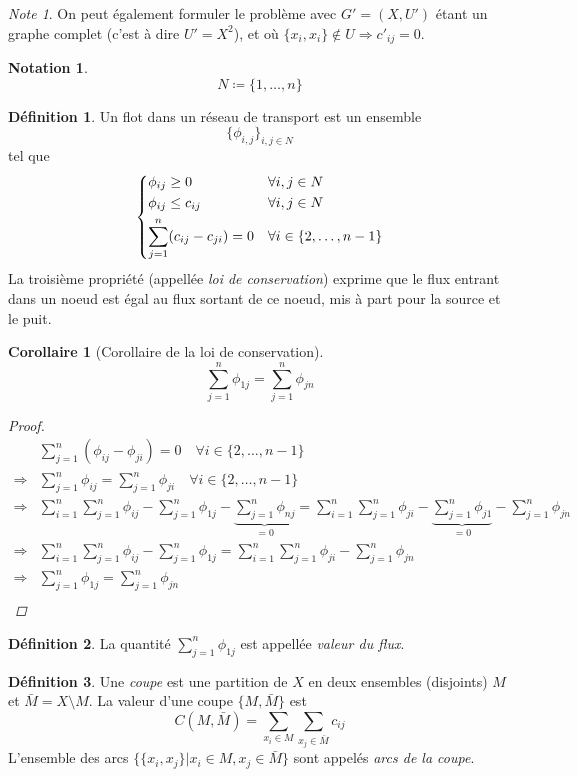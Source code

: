 \documentclass[a4paper]{report}
\theoremstyle{definition}
\newtheorem*{definition}{Définition}
\newtheorem*{notation}{Notation}
\theoremstyle{remark}
\newtheorem*{note}{Note}
\theoremstyle{plain}
\newtheorem{corollary}{Corollaire}
\begin{document}
\begin{note}
On peut également formuler le problème avec \(G'=(X,U')\) étant un graphe
complet (c'est à dire \(U'=X^2\)), et où \(\{x_i,x_i\}\notin U\Rightarrow
c'_{ij}=0\).
\end{note}

\begin{notation}
\[N\coloneqq\{1,\dots,n\}\]
\end{notation}

\begin{definition}
Un flot dans un réseau de transport est un ensemble
\[\{\phi_{i,j}\}_{i,j\in N}\]
tel que
\[\begin{dcases}
	\phi_{ij}\ge 0                 &\forall i,j\in N\\
	\phi_{ij}\le c_{ij}            &\forall i,j\in N\\
	\sum_{j=1}^n(c_{ij}-c_{ji})=0 &\forall i\in \{2,\dots,n-1\}
\end{dcases}\]
La troisième propriété (appellée \emph{loi de conservation}) exprime que le flux
entrant dans un noeud est égal au flux sortant de ce noeud, mis à part pour la
source et le puit.
\end{definition}

\begin{corollary}[Corollaire de la loi de conservation]
\[\sum_{j=1}^n\phi_{1j}=\sum_{j=1}^n\phi_{jn}\]
\begin{proof}
\begin{align}
	&\sum_{j=1}^n(\phi_{ij}-\phi_{ji})=0\quad\forall i\in\{2,\dots,n-1\}\\
	\Rightarrow&\sum_{j=1}^n\phi_{ij}=\sum_{j=1}^n\phi_{ji}\quad\forall i\in\{2,\dots,n-1\}\\
	\Rightarrow&\sum_{i=1}^n\sum_{j=1}^n\phi_{ij}-\sum_{j=1}^n\phi_{1j}-\underbrace{\sum_{j=1}^n\phi_{nj}}_{=0}
		=\sum_{i=1}^n\sum_{j=1}^n\phi_{ji}-\underbrace{\sum_{j=1}^n\phi_{j1}}_{=0}-\sum_{j=1}^n\phi_{jn}\\
	\Rightarrow&\sum_{i=1}^n\sum_{j=1}^n\phi_{ij}-\sum_{j=1}^n\phi_{1j}=
		\sum_{i=1}^n\sum_{j=1}^n\phi_{ji}-\sum_{j=1}^n\phi_{jn}\\
	\Rightarrow&\sum_{j=1}^n\phi_{1j}=\sum_{j=1}^n\phi_{jn}\\
\end{align}
\end{proof}
\end{corollary}

\begin{definition}
	La quantité \(\sum_{j=1}^n\phi_{1j}\) est appellée \emph{valeur du flux}.
\end{definition}

\begin{definition}
Une \emph{coupe} est une partition de \(X\) en deux ensembles (disjoints) \(M\)
et \(\bar M=X\setminus M\). La valeur d'une coupe \(\{M,\bar M\}\) est
\[C(M,\bar M)=\sum_{x_i\in M}\sum_{x_j\in\bar M}c_{ij}\] L'ensemble des arcs
\(\{\{x_i,x_j\}|x_i\in M,x_j\in\bar M\}\) sont appelés \emph{arcs de la coupe}.
\end{definition}
\end{document}
